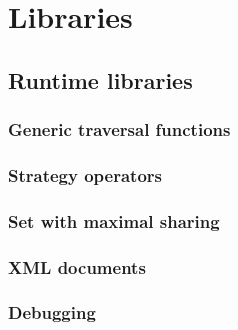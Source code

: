 \part{Libraries} 
\chapter{Runtime libraries}

\section{Generic traversal functions}

\section{Strategy operators}

\section{Set with maximal sharing}

\section{XML documents}

\section{Debugging}

